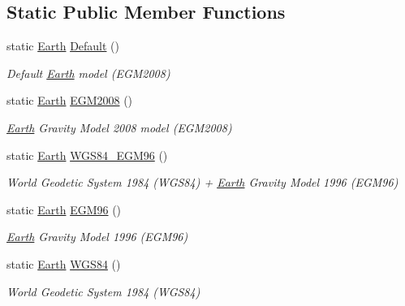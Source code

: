 \subsection*{Static Public Member Functions}
\begin{DoxyCompactItemize}
\item 
static \hyperlink{classlibrary_1_1physics_1_1env_1_1obj_1_1celest_1_1_earth}{Earth} \hyperlink{classlibrary_1_1physics_1_1env_1_1obj_1_1celest_1_1_earth_a01853b8ce201525ee6cec2f00e1580d4}{Default} ()
\begin{DoxyCompactList}\small\item\em Default \hyperlink{classlibrary_1_1physics_1_1env_1_1obj_1_1celest_1_1_earth}{Earth} model (E\+G\+M2008) \end{DoxyCompactList}\item 
static \hyperlink{classlibrary_1_1physics_1_1env_1_1obj_1_1celest_1_1_earth}{Earth} \hyperlink{classlibrary_1_1physics_1_1env_1_1obj_1_1celest_1_1_earth_a24492fd9077ed4ac7d55118f3f98e30c}{E\+G\+M2008} ()
\begin{DoxyCompactList}\small\item\em \hyperlink{classlibrary_1_1physics_1_1env_1_1obj_1_1celest_1_1_earth}{Earth} Gravity Model 2008 model (E\+G\+M2008) \end{DoxyCompactList}\item 
static \hyperlink{classlibrary_1_1physics_1_1env_1_1obj_1_1celest_1_1_earth}{Earth} \hyperlink{classlibrary_1_1physics_1_1env_1_1obj_1_1celest_1_1_earth_ace43736c4101b542e7e1e2dec090274c}{W\+G\+S84\+\_\+\+E\+G\+M96} ()
\begin{DoxyCompactList}\small\item\em World Geodetic System 1984 (W\+G\+S84) + \hyperlink{classlibrary_1_1physics_1_1env_1_1obj_1_1celest_1_1_earth}{Earth} Gravity Model 1996 (E\+G\+M96) \end{DoxyCompactList}\item 
static \hyperlink{classlibrary_1_1physics_1_1env_1_1obj_1_1celest_1_1_earth}{Earth} \hyperlink{classlibrary_1_1physics_1_1env_1_1obj_1_1celest_1_1_earth_a6774555411628b2a8032186efd14f33d}{E\+G\+M96} ()
\begin{DoxyCompactList}\small\item\em \hyperlink{classlibrary_1_1physics_1_1env_1_1obj_1_1celest_1_1_earth}{Earth} Gravity Model 1996 (E\+G\+M96) \end{DoxyCompactList}\item 
static \hyperlink{classlibrary_1_1physics_1_1env_1_1obj_1_1celest_1_1_earth}{Earth} \hyperlink{classlibrary_1_1physics_1_1env_1_1obj_1_1celest_1_1_earth_ab0b1718b4cd072d56aee93a42f10b33f}{W\+G\+S84} ()
\begin{DoxyCompactList}\small\item\em World Geodetic System 1984 (W\+G\+S84) \end{DoxyCompactList}\end{DoxyCompactItemize}
